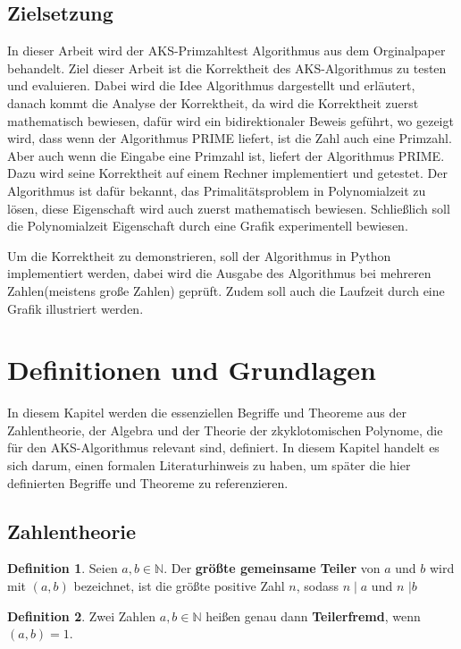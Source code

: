 \documentclass[12pt,oneside]{article}
\theoremstyle{remark}
\theoremstyle{definition}
\newtheorem{definition}{Definition}[section]
\begin{document}
\subsection{Zielsetzung}
In dieser Arbeit wird der AKS-Primzahltest Algorithmus aus dem Orginalpaper behandelt. Ziel dieser Arbeit ist die Korrektheit des AKS-Algorithmus zu testen und evaluieren. Dabei wird die Idee Algorithmus dargestellt und erläutert, danach kommt die Analyse der Korrektheit, da wird die Korrektheit zuerst mathematisch bewiesen, dafür wird ein bidirektionaler Beweis geführt, wo gezeigt wird, dass wenn der Algorithmus PRIME liefert, ist die Zahl auch eine Primzahl. Aber auch wenn die Eingabe eine Primzahl ist, liefert der Algorithmus PRIME. Dazu wird seine Korrektheit auf einem Rechner implementiert und getestet. Der Algorithmus ist dafür bekannt, das Primalitätsproblem in Polynomialzeit zu lösen, diese Eigenschaft wird auch zuerst mathematisch bewiesen. Schließlich soll die Polynomialzeit Eigenschaft durch eine Grafik experimentell bewiesen.  

Um die Korrektheit zu demonstrieren, soll der Algorithmus in Python implementiert werden, dabei wird die Ausgabe des Algorithmus bei mehreren Zahlen(meistens große Zahlen) geprüft. Zudem soll auch die Laufzeit durch eine Grafik illustriert werden.  


\section{Definitionen und Grundlagen}
In diesem Kapitel werden die essenziellen Begriffe und Theoreme aus der Zahlentheorie, der Algebra und der Theorie der zkyklotomischen Polynome, die für den AKS-Algorithmus relevant sind, definiert. In diesem Kapitel handelt es sich darum, einen formalen Literaturhinweis zu haben, um später die hier definierten Begriffe und Theoreme zu referenzieren.
\subsection{Zahlentheorie}
\theoremstyle{definition}
\begin{definition}\label{Df_1}
Seien $a,b \in \mathbb{N}$. Der \textbf{größte gemeinsame Teiler} von $a$ und $b$ wird mit $(a,b)$ bezeichnet, ist die größte positive Zahl $n$, sodass $n \mid a$ und $n$ $ \mid b$
\end{definition}

\smallskip 

\begin{definition}\label{Df_2}
Zwei Zahlen $a,b \in \mathbb{N}$ heißen genau dann \textbf{Teilerfremd}, wenn $(a,b) = 1$.
\end{definition}
\end{document}
